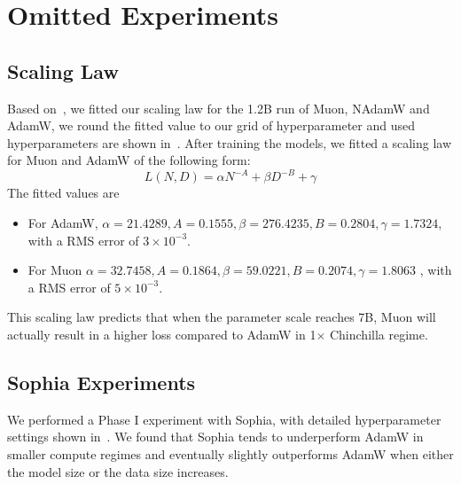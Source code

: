 \section{Omitted Experiments}
\label{app:experiments}

\subsection{Scaling Law}
\label{app:scaling_law}

Based on~, we fitted our scaling law for the 1.2B run of Muon, NAdamW and AdamW, we round the fitted value to our grid of hyperparameter and used hyperparameters are shown in~.
After training the models, we fitted a scaling law for Muon and AdamW of the following form:
\begin{equation}
    L(N,D) = \alpha N^{-A} + \beta D^{{-B}} + \gamma
\end{equation}
The fitted values are 
\begin{itemize}
    \item For AdamW, $  \alpha = 21.4289,
  A = 0.1555,
  \beta = 276.4235,
  B = 0.2804,
  \gamma = 1.7324$, with a RMS error of $3 \times 10^{-3}$.
    \item For Muon   $\alpha = 32.7458, A = 0.1864, \beta = 59.0221, B = 0.2074,\gamma = 1.8063$ , with a RMS error of $5 \times 10^{-3}$.
\end{itemize}

This scaling law predicts that when the parameter scale reaches 7B, Muon will actually result in a higher loss compared to AdamW in 1$\times$ Chinchilla regime.



\subsection{Sophia Experiments}
\label{app:sophia_experiments}

We performed a Phase I experiment with Sophia, with detailed hyperparameter settings shown in~. We found that Sophia tends to underperform AdamW in smaller compute regimes and eventually slightly outperforms AdamW when either the model size or the data size increases. 


